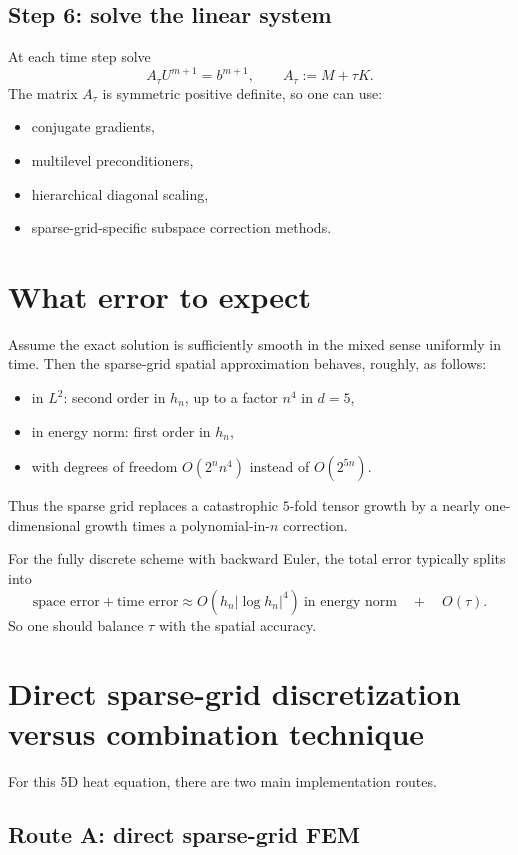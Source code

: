 \documentclass[11pt,a4paper]{report}
\begin{document}
\subsection{Step 6: solve the linear system}

At each time step solve
$$
A_\tau U^{m+1}=b^{m+1},
\qquad
A_\tau:=M+\tau K.
$$
The matrix $A_\tau$ is symmetric positive definite, so one can use:
\begin{itemize}
\item conjugate gradients,
\item multilevel preconditioners,
\item hierarchical diagonal scaling,
\item sparse-grid-specific subspace correction methods.
\end{itemize}

\section{What error to expect}

Assume the exact solution is sufficiently smooth in the mixed sense uniformly in time. Then the sparse-grid spatial approximation behaves, roughly, as follows:
\begin{itemize}
\item in $L^2$: second order in $h_n$, up to a factor $n^{4}$ in $d=5$,
\item in energy norm: first order in $h_n$,
\item with degrees of freedom $O(2^n n^4)$ instead of $O(2^{5n})$.
\end{itemize}
Thus the sparse grid replaces a catastrophic $5$-fold tensor growth by a nearly one-dimensional growth times a polynomial-in-$n$ correction.

For the fully discrete scheme with backward Euler, the total error typically splits into
$$
\text{space error} + \text{time error}
\approx
O(h_n |\log h_n|^{4}) \ \text{in energy norm}
\quad+\quad O(\tau).
$$
So one should balance $\tau$ with the spatial accuracy.

\section{Direct sparse-grid discretization versus combination technique}

For this 5D heat equation, there are two main implementation routes.

\subsection{Route A: direct sparse-grid FEM}
\end{document}
